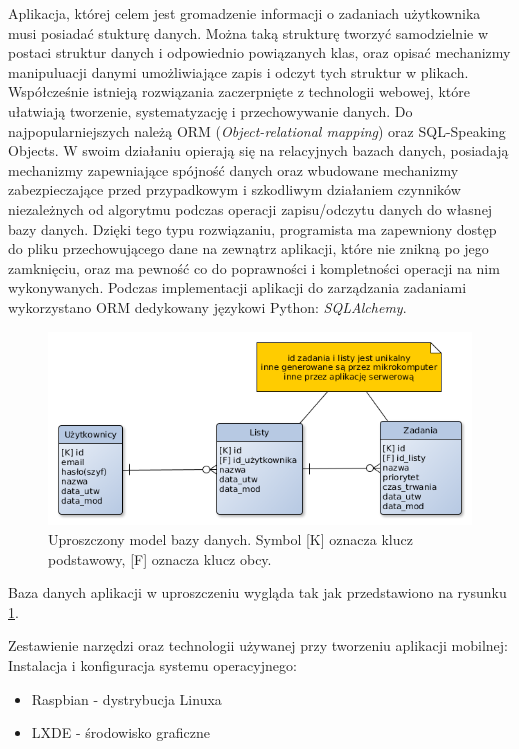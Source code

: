 Aplikacja, której celem jest gromadzenie informacji o zadaniach użytkownika musi posiadać stukturę danych. Można taką strukturę tworzyć samodzielnie w postaci struktur danych i odpowiednio powiązanych klas, oraz opisać mechanizmy manipuluacji danymi umożliwiające zapis i odczyt tych struktur w plikach. Współcześnie istnieją rozwiązania zaczerpnięte z technologii webowej, które ułatwiają tworzenie, systematyzację i przechowywanie danych. Do najpopularniejszych należą ORM (\textit{Object-relational mapping}) oraz SQL-Speaking Objects. W swoim działaniu opierają się na relacyjnych bazach danych, posiadają mechanizmy zapewniające spójność danych oraz wbudowane mechanizmy zabezpieczające przed przypadkowym i szkodliwym działaniem czynników niezależnych od algorytmu podczas operacji zapisu/odczytu danych do własnej bazy danych. Dzięki tego typu rozwiązaniu, programista ma zapewniony dostęp do pliku przechowującego dane na zewnątrz aplikacji, które nie znikną po jego zamknięciu, oraz ma pewność co do poprawności i kompletności operacji na nim wykonywanych. Podczas implementacji aplikacji do zarządzania zadaniami wykorzystano ORM dedykowany językowi Python: \textit{SQLAlchemy}.


\begin{figure}[ht]
  \centering
  \includegraphics[width=\textwidth]{images/dane.png}
  \caption{Uproszczony model bazy danych. Symbol [K] oznacza klucz podstawowy, [F] oznacza klucz obcy.}
  \label{figure:dane}
\end{figure}

Baza danych aplikacji w uproszczeniu wygląda tak jak przedstawiono na rysunku \ref{figure:dane}.

Zestawienie narzędzi oraz technologii używanej przy tworzeniu aplikacji mobilnej:
Instalacja i konfiguracja systemu operacyjnego:
\begin{itemize}
  \item Raspbian - dystrybucja Linuxa
  \item LXDE - środowisko graficzne
\end{itemize}

